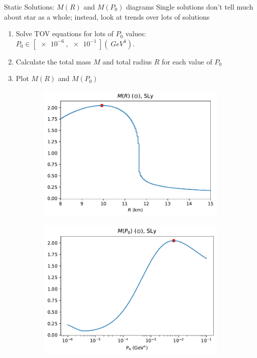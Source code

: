 \documentclass[handout]{beamer}
\begin{document}
    \begin{frame}{Static Solutions: $M(R)$ and $M(P_0)$ diagrams}
        \pause
        Single solutions don't tell much about star as a whole; instead, look at trends over lots of solutions \pause
        \begin{enumerate}
            \item Solve TOV equations for lots of $P_0$ values: \pause $P_0 \in [\SI{e-6}{}, \SI{e-1}{}](\SI{}{GeV^4}).$\pause
            \item Calculate the total mass $M$ and total radius $R$ for each value of $P_0$ \pause
            \item Plot $M(R)$ and $M(P_0)$\pause
        \end{enumerate}

        \begin{figure}[h!]
            \centering
            \begin{subfigure}{.5\textwidth}
                \includegraphics[width = \textwidth]{r_analysis,SLy.pdf}
            \end{subfigure}%
            \begin{subfigure}{.5\textwidth}
                \includegraphics[width = \textwidth]{p0_analysis,SLy.pdf}

\end{subfigure}
\end{figure}
\end{frame}
\end{document}

